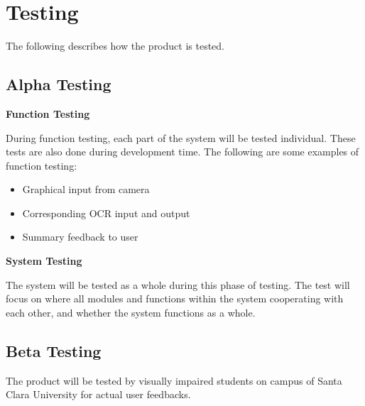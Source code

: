 \chapter{Testing}

	The following describes how the product is tested.

	\section{Alpha Testing}
		\textbf{Function Testing}

		During function testing, each part of the system will be tested individual. These tests are also done during development time.
		The following are some examples of function testing:
		\begin{itemize}
			\item Graphical input from camera
			\item Corresponding OCR input and output
			\item Summary feedback to user
		\end{itemize}

		\textbf{System Testing}

		The system will be tested as a whole during this phase of testing. The test will focus on where all modules and functions within the system cooperating with each other, and whether the system functions as a whole.

	\section{Beta Testing}
	The product will be tested by visually impaired students on campus of Santa Clara University for actual user feedbacks.